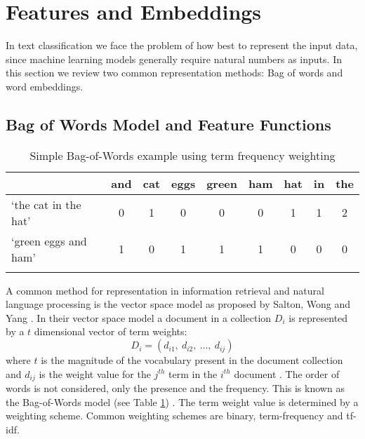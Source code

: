 \documentclass[Dissertation.tex]{subfiles}
\begin{document}
\section{Features and Embeddings}\label{sec:featsEmbeds}
In text classification we face the problem of how best to represent the input data, since machine learning models generally require natural numbers as inputs. In this section we review two common representation methods:  Bag of words and word embeddings.

\subsection{Bag of Words Model and Feature Functions}\label{sec:vecSpace}


\begin{table}[]
	\caption{Simple Bag-of-Words example using term frequency weighting}
	\label{bagOfWords}
	\centering
	\begin{tabular}{@{}lllllllll@{}}
		\toprule
		& and                    & cat                    & eggs                   & green                  & ham                    & hat                    & in                     & the                    \\ \midrule  \cline{2-9} 
		\multicolumn{1}{l|}{`the cat in the hat'} & \multicolumn{1}{c|}{0} & \multicolumn{1}{c|}{1} & \multicolumn{1}{c|}{0} & \multicolumn{1}{c|}{0} & \multicolumn{1}{c|}{0} & \multicolumn{1}{c|}{1} & \multicolumn{1}{c|}{1} & \multicolumn{1}{c|}{2} \\ \cline{2-9} 
		\multicolumn{1}{l|}{`green eggs and ham'} & \multicolumn{1}{c|}{1} & \multicolumn{1}{c|}{0} & \multicolumn{1}{c|}{1} & \multicolumn{1}{c|}{1} & \multicolumn{1}{c|}{1} & \multicolumn{1}{c|}{0} & \multicolumn{1}{c|}{0} & \multicolumn{1}{c|}{0} \\  \cline{2-9} 
		&                        &                        &                        &                        &                        &                        &                        &                        \\ \bottomrule
	\end{tabular}
	
\end{table}

A common method for representation in information retrieval and natural language processing is the vector space model as proposed by Salton, Wong and Yang \cite{saltonVectorSpaceModel1975}. In their vector space model a document in a collection $ D_i $ is represented by a $ t $ dimensional vector of term weights: $$ D_i = (d_{i1},\ d_{i2},\ \dots,\ d_{ij})  $$ where $ t $ is the magnitude of the vocabulary present in the document collection and $ d_{ij} $ is the weight value for the $ j^{th} $ term in the $ i^{th} $ document \cite{saltonVectorSpaceModel1975}.
The order of words is not considered, only the presence and the frequency. This is known as the Bag-of-Words model (see Table \ref{bagOfWords}) \cite{jurafskySpeechLanguageProcessing}. The term weight value is determined by a weighting scheme. Common weighting schemes are binary, term-frequency and tf-idf.
\end{document}
